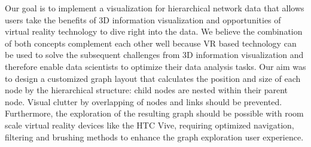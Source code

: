 Our goal is to implement a visualization for hierarchical network data that allows users take the benefits of 3D information visualization and opportunities of virtual reality technology to dive right into the data. We believe the combination of both concepts complement each other well because VR based technology can be used to solve the subsequent challenges from 3D information visualization and therefore enable data scientists to optimize their data analysis tasks. 
Our aim was to design a customized graph layout that calculates the position and size of each node by the hierarchical structure: child nodes are nested within their parent node. 
Visual clutter by overlapping of nodes and links should be prevented. 
Furthermore, the exploration of the resulting graph should be possible with room scale virtual reality devices like the HTC Vive, requiring optimized navigation, filtering and brushing methods to enhance the graph exploration user experience.

